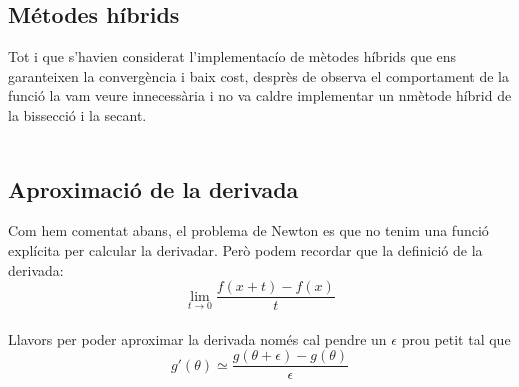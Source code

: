 \documentclass{article}
\begin{document}
\subsection*{M\'etodes h\'ibrids}
\quad Tot i que s'havien considerat l'implementac\'io de m\`etodes h\'ibrids que ens garanteixen la converg\`encia i baix cost, despr\`es de observa el comportament de la funci\'o la vam veure innecess\`aria i no va caldre implementar un nm\`etode h\'ibrid de la bissecci\'o i la secant. 
\\\\

\subsection*{Aproximaci\'o de la derivada}
\quad Com hem comentat abans, el problema de Newton es que no tenim una funci\'o expl\'icita per calcular la derivadar. Per\`o podem recordar que la definici\'o de la derivada:
	 $$\lim_{t\to0} \frac{f(x+t) - f(x)}{t}$$ \\
Llavors per poder aproximar la derivada nom\'es cal pendre un $\epsilon$ prou petit tal que $$g'(\theta) \simeq \frac{g(\theta+\epsilon) - g(\theta)}{\epsilon}$$
\end{document}
